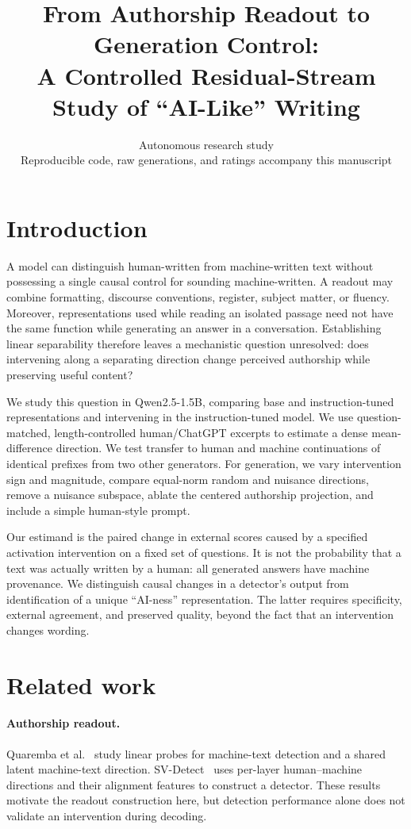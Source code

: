 \documentclass[10pt,twocolumn]{article}
\title{From Authorship Readout to Generation Control:\\A Controlled Residual-Stream Study of ``AI-Like'' Writing}
\author{Autonomous research study\\\small Reproducible code, raw generations, and ratings accompany this manuscript}
\date{}
\begin{document}
\raggedbottom
\maketitle

\section{Introduction}
A model can distinguish human-written from machine-written text without possessing a single causal control for sounding machine-written. A readout may combine formatting, discourse conventions, register, subject matter, or fluency. Moreover, representations used while reading an isolated passage need not have the same function while generating an answer in a conversation. Establishing linear separability therefore leaves a mechanistic question unresolved: does intervening along a separating direction change perceived authorship while preserving useful content?

We study this question in Qwen2.5-1.5B, comparing base and instruction-tuned representations and intervening in the instruction-tuned model. We use question-matched, length-controlled human/ChatGPT excerpts to estimate a dense mean-difference direction. We test transfer to human and machine continuations of identical prefixes from two other generators. For generation, we vary intervention sign and magnitude, compare equal-norm random and nuisance directions, remove a nuisance subspace, ablate the centered authorship projection, and include a simple human-style prompt.

Our estimand is the paired change in external scores caused by a specified activation intervention on a fixed set of questions. It is not the probability that a text was actually written by a human: all generated answers have machine provenance. We distinguish causal changes in a detector's output from identification of a unique ``AI-ness'' representation. The latter requires specificity, external agreement, and preserved quality, beyond the fact that an intervention changes wording.

\section{Related work}
\paragraph{Authorship readout.} Quaremba et al.~\cite{quaremba2026} study linear probes for machine-text detection and a shared latent machine-text direction. SV-Detect~\cite{vishnyakov2026} uses per-layer human--machine directions and their alignment features to construct a detector. These results motivate the readout construction here, but detection performance alone does not validate an intervention during decoding.
\end{document}
